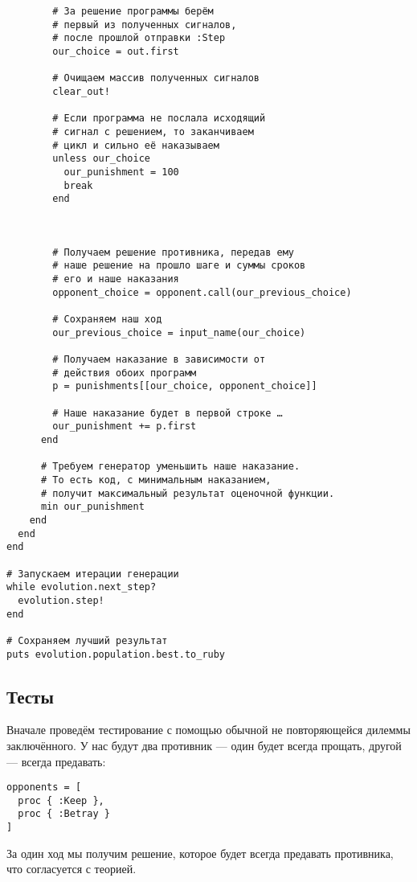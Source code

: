 \documentclass[utf8,a5paper,portrait,10pt,twoside]{eskdtext}
\begin{document}
\begin{verbatim}
        # За решение программы берём
        # первый из полученных сигналов,
        # после прошлой отправки :Step
        our_choice = out.first
        
        # Очищаем массив полученных сигналов
        clear_out!
        
        # Если программа не послала исходящий
        # сигнал с решением, то заканчиваем
        # цикл и сильно её наказываем
        unless our_choice
          our_punishment = 100
          break
        end
        
        
        
        # Получаем решение противника, передав ему
        # наше решение на прошло шаге и суммы сроков
        # его и наше наказания
        opponent_choice = opponent.call(our_previous_choice)
        
        # Сохраняем наш ход
        our_previous_choice = input_name(our_choice)
        
        # Получаем наказание в зависимости от
        # действия обоих программ
        p = punishments[[our_choice, opponent_choice]]
        
        # Наше наказание будет в первой строке …
        our_punishment += p.first
      end
      
      # Требуем генератор уменьшить наше наказание.
      # То есть код, с минимальным наказанием,
      # получит максимальный результат оценочной функции.
      min our_punishment
    end
  end
end

# Запускаем итерации генерации
while evolution.next_step?
  evolution.step!
end

# Сохраняем лучший результат
puts evolution.population.best.to_ruby
\end{verbatim}

\subsection{Тесты}

Вначале проведём тестирование с помощью обычной не повторяющейся дилеммы
заключённого. У нас будут два противник — один будет всегда прощать, другой —
всегда предавать:

\begin{verbatim}
opponents = [
  proc { :Keep },
  proc { :Betray }
]
\end{verbatim}

За один ход мы получим решение, которое будет всегда предавать противника,
что согласуется с теорией.
\end{document}
